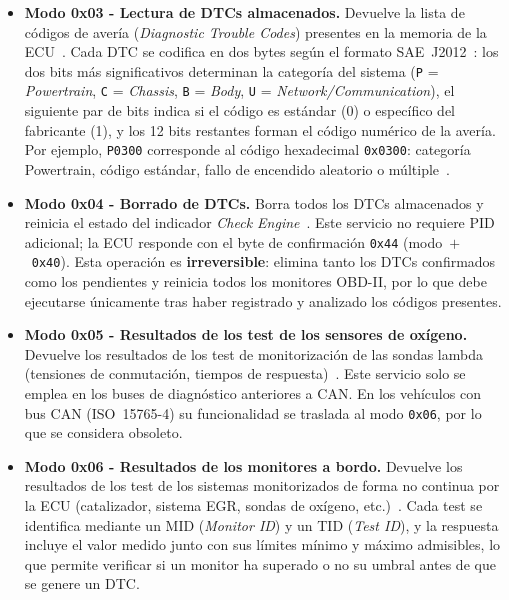 \begin{itemize}
    \item \textbf{Modo 0x03 - Lectura de DTCs almacenados.} Devuelve la lista de códigos de avería (\textit{Diagnostic Trouble Codes}) presentes en la memoria de la ECU~\cite{SAEJ1979:2014}. Cada DTC se codifica en dos bytes según el formato SAE~J2012~\cite{SAEJ2012:2016}: los dos bits más significativos determinan la categoría del sistema (\texttt{P} = \textit{Powertrain}, \texttt{C} = \textit{Chassis}, \texttt{B} = \textit{Body}, \texttt{U} = \textit{Network/Communication}), el siguiente par de bits indica si el código es estándar (0) o específico del fabricante (1), y los 12 bits restantes forman el código numérico de la avería. Por ejemplo, \texttt{P0300} corresponde al código hexadecimal \texttt{0x0300}: categoría Powertrain, código estándar, fallo de encendido aleatorio o múltiple~\cite{SAEJ2012:2016, WaleedDTC}.

    \item \textbf{Modo 0x04 - Borrado de DTCs.} Borra todos los DTCs almacenados y reinicia el estado del indicador \textit{Check Engine}~\cite{SAEJ1979:2014}. Este servicio no requiere PID adicional; la ECU responde con el byte de confirmación \texttt{0x44} (modo~$+$~\texttt{0x40}). Esta operación es \textbf{irreversible}: elimina tanto los DTCs confirmados como los pendientes y reinicia todos los monitores OBD-II, por lo que debe ejecutarse únicamente tras haber registrado y analizado los códigos presentes.

    \item \textbf{Modo 0x05 - Resultados de los test de los sensores de oxígeno.} Devuelve los resultados de los test de monitorización de las sondas lambda (tensiones de conmutación, tiempos de respuesta)~\cite{SAEJ1979:2014}. Este servicio solo se emplea en los buses de diagnóstico anteriores a CAN. En los vehículos con bus CAN (ISO~15765-4) su funcionalidad se traslada al modo \texttt{0x06}, por lo que se considera obsoleto.

    \item \textbf{Modo 0x06 - Resultados de los monitores a bordo.} Devuelve los resultados de los test de los sistemas monitorizados de forma no continua por la ECU (catalizador, sistema EGR, sondas de oxígeno, etc.)~\cite{SAEJ1979:2014}. Cada test se identifica mediante un MID (\textit{Monitor ID}) y un TID (\textit{Test ID}), y la respuesta incluye el valor medido junto con sus límites mínimo y máximo admisibles, lo que permite verificar si un monitor ha superado o no su umbral antes de que se genere un DTC.


\end{itemize}
